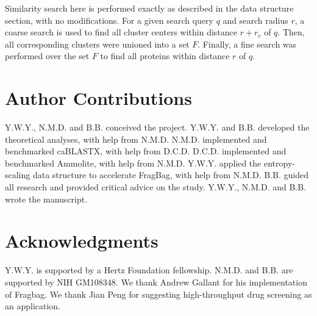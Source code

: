 \documentclass[review,preprint,12pt]{elsarticle}
\theoremstyle{definition}
\theoremstyle{remark}
\numberwithin{equation}{section}
\begin{document}
Similarity search here is performed exactly as described in the data structure section, with no modifications.
For a given search query $q$ and search radius $r$,
a coarse search is used to find all cluster centers within distance $r+r_c$ of $q$.
Then, all corresponding clusters were unioned into a set $F$.
Finally, a fine search was performed over the set $F$ to find all proteins within distance $r$ of $q$.

\section{Author Contributions}
Y.W.Y., N.M.D. and B.B. conceived the project.
Y.W.Y. and B.B. developed the theoretical analyses, with help from N.M.D.
N.M.D. implemented and benchmarked caBLASTX, with help from D.C.D.
D.C.D. implemented and benchmarked Ammolite, with help from N.M.D.
Y.W.Y. applied the entropy-scaling data structure to accelerate FragBag, with help from N.M.D.
B.B. guided all research and provided critical advice on the study.
Y.W.Y., N.M.D. and B.B. wrote the manuscript.

\section{Acknowledgments}
Y.W.Y. is supported by a Hertz Foundation fellowship.
N.M.D. and B.B. are supported by NIH GM108348.
We thank Andrew Gallant for his implementation of Fragbag.
We thank Jian Peng for suggesting high-throughput drug screening as an application.


%

\end{document}
